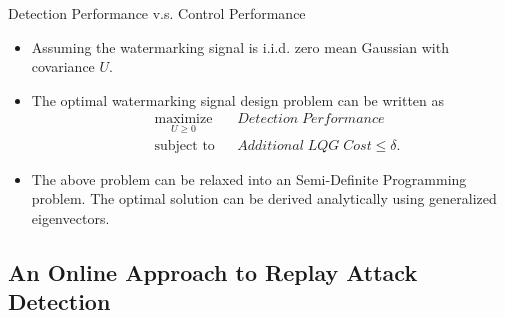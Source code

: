\documentclass[10pt]{beamer}
\begin{document}
\begin{frame}{Detection Performance v.s. Control Performance}
  \begin{itemize}
    \item Assuming the watermarking signal is i.i.d. zero mean Gaussian with covariance $U$.
    \item The optimal watermarking signal design problem can be written as
      \begin{align*}
      &\mathop{\textrm{maximize}}\limits_{U\geq 0}&
      & Detection\;Performance\\
      &\textrm{subject to}&
      & Additional\;LQG\;Cost \leq \delta.
      \end{align*}
    \item The above problem can be relaxed into an Semi-Definite Programming problem. The optimal solution can be derived analytically using generalized eigenvectors.
  \end{itemize}
\end{frame}
%

\subsection{An Online Approach to Replay Attack Detection}
\end{document}
